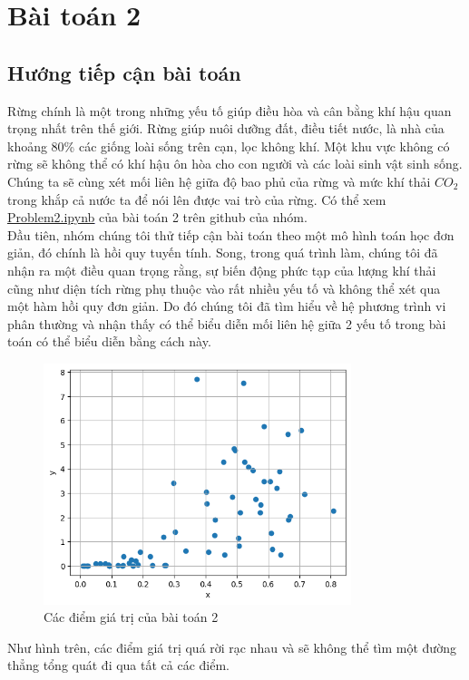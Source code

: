 \documentclass[a4paper,12pt]{report}
\begin{document}


\chapter{Bài toán 2} %
\label{cha:bài_toán_2}

\section{Hướng tiếp cận bài toán} %
\label{sec:tiếp_cận_bài_toán}
\begin{flushleft}
	Rừng chính là một trong những yếu tố giúp điều hòa và cân bằng khí hậu quan trọng nhất trên thế giới. Rừng giúp nuôi dưỡng đất, điều tiết nước, là nhà của khoảng 80\% các giống loài sống trên cạn, lọc không khí. Một khu vực không có rừng sẽ không thể có khí hậu ôn hòa cho con người và các loài sinh vật sinh sống. Chúng ta sẽ cùng xét mối liên hệ giữa độ bao phủ của rừng và mức khí thải $CO_{2}$ trong khắp cả nước ta để nói lên được vai trò của rừng. Có thể xem \textcolor{blue}{\underline{\href{https://github.com/XuananLe/MathModelingContest/blob/main/APM_TMH_V2/Problem2.ipynb}{Problem2.ipynb}}} của bài toán 2 trên github của nhóm.
	\\[\baselineskip]

	Đầu tiên, nhóm chúng tôi thử tiếp cận bài toán theo một mô hình toán học đơn giản, đó chính là hồi quy tuyến tính. Song, trong quá trình làm, chúng tôi đã nhận ra một điều quan trọng rằng, sự biến động phức tạp của lượng khí thải cũng như diện tích rừng phụ thuộc vào rất nhiều yếu tố và không thể xét qua một hàm hồi quy đơn giản. Do đó chúng tôi đã tìm hiểu về hệ phương trình vi phân thường và nhận thấy có thể biểu diễn mối liên hệ giữa 2 yếu tố trong bài toán có thể biểu diễn bằng cách này.

	\begin{figure}[H]
		\centering
		\includegraphics[width = 0.8\textwidth]{images/linear_problem2.png}
		\caption{Các điểm giá trị của bài toán 2}
	\end{figure}

	Như hình trên, các điểm giá trị quá rời rạc nhau và sẽ không thể tìm một đường thẳng tổng quát đi qua tất cả các điểm.
\end{flushleft}
\end{document}
